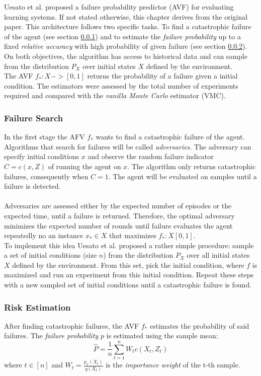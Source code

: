 Uesato et al. \cite{uesato18} proposed a failure probability predictor (AVF) for evaluating learning systems. If not stated otherwise, this chapter derives from the original paper. This architecture follows two specific tasks. To find a catastrophic failure of the agent (see section \ref{failure}) and to estimate the \textit{failure probability} up to a fixed \textit{relative accuracy} with high probability of given failure (see section \ref{risk}).\\
On both objectives, the algorithm has access to historical data and can sample from the distribution $P_X$ over initial states $X$ defined by the environment.\\
The AVF $f_*:X->[0,1]$ returns the probability of a failure given a initial condition. The estimators were assessed by the total number of experiments required and compared with 
the \textit{vanilla Monte Carlo} estimator (VMC).

\subsubsection{Failure Search}
\label{failure}

In the first stage the AFV $f_*$ wants to find a catastrophic failure of the agent. Algorithms that search for failures will be called \textit{adversaries}. The adversary can specify initial conditions $x$ and observe the random failure indicator $C = c(x,Z)$ of running the agent on $x$. The algorithm only returns catastrophic failures, consequently when $C = 1$. The agent will be evaluated on samples until a failure is detected.\\\\
Adversaries are assessed either by the expected number of episodes or the expected time, until a failure is returned. Therefore, the optimal adversary minimizes the expected number of rounds until failure evaluates the agent repeatedly no an instance $x_* \in X$ that maximizes $f_* : X [0,1]$.\\
To implement this idea Uesato et al. \cite{uesato18} proposed a rather simple procedure: sample a set of initial conditions (size $n$) from the distribution $P_X$ over all initial states $X$ defined by the environment. From this set, pick the initial condition, where $f$ is maximized and run an experiment from this initial condition. Repeat these steps with a new sampled set of initial conditions until a catastrophic failure is found. 

\subsubsection{Risk Estimation}
\label{risk}

After finding catastrophic failures, the AVF $f_*$ estimates the probability of said failures. The \textit{failure probability} $p$ is estimated using the sample mean:\\
\begin{equation}
\hat{P} = \frac{1}{n} \sum_{t=1}^n W_t c(X_t, Z_t)
\end{equation}
where $t \in [n]$ and $W_t = \frac{p_x(X_t)}{q(X_t)}$ is the \textit{importance weight} of the t-th sample. 
